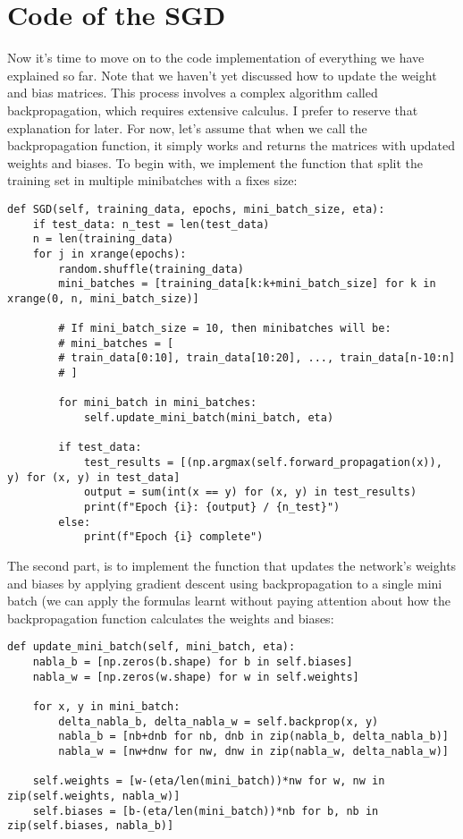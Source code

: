 \documentclass[../main]{subfiles}
\begin{document}
\section{Code of the SGD}
Now it's time to move on to the code implementation of everything we have explained so far. Note that we haven't yet discussed how to update the weight and bias matrices. This process involves a complex algorithm called backpropagation, which requires extensive calculus. I prefer to reserve that explanation for later. For now, let's assume that when we call the backpropagation function, it simply works and returns the matrices with updated weights and biases. To begin with, we implement the function that split the training set in multiple minibatches with a fixes size:
\begin{lstlisting}
def SGD(self, training_data, epochs, mini_batch_size, eta):
    if test_data: n_test = len(test_data)
    n = len(training_data)
    for j in xrange(epochs):
        random.shuffle(training_data)
        mini_batches = [training_data[k:k+mini_batch_size] for k in xrange(0, n, mini_batch_size)]
        
        # If mini_batch_size = 10, then minibatches will be:
        # mini_batches = [ 
        # train_data[0:10], train_data[10:20], ..., train_data[n-10:n]
        # ]
        
        for mini_batch in mini_batches:
            self.update_mini_batch(mini_batch, eta)

        if test_data:
            test_results = [(np.argmax(self.forward_propagation(x)), y) for (x, y) in test_data]
            output = sum(int(x == y) for (x, y) in test_results)
            print(f"Epoch {i}: {output} / {n_test}")
        else:
            print(f"Epoch {i} complete")
\end{lstlisting}
The second part, is to implement the function that updates the network's weights and biases by applying gradient descent using backpropagation to a single mini batch (we can apply the formulas learnt without paying attention about how the backpropagation function calculates the weights and biases:
\begin{lstlisting}
def update_mini_batch(self, mini_batch, eta):
    nabla_b = [np.zeros(b.shape) for b in self.biases]
    nabla_w = [np.zeros(w.shape) for w in self.weights]
    
    for x, y in mini_batch:
        delta_nabla_b, delta_nabla_w = self.backprop(x, y)
        nabla_b = [nb+dnb for nb, dnb in zip(nabla_b, delta_nabla_b)]
        nabla_w = [nw+dnw for nw, dnw in zip(nabla_w, delta_nabla_w)]
        
    self.weights = [w-(eta/len(mini_batch))*nw for w, nw in zip(self.weights, nabla_w)]
    self.biases = [b-(eta/len(mini_batch))*nb for b, nb in zip(self.biases, nabla_b)]
\end{lstlisting}
\end{document}
